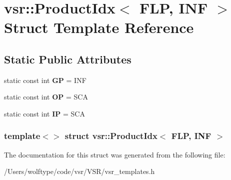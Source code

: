 \hypertarget{structvsr_1_1_product_idx_3_01_f_l_p_00_01_i_n_f_01_4}{\section{vsr\-:\-:Product\-Idx$<$ F\-L\-P, I\-N\-F $>$ Struct Template Reference}
\label{structvsr_1_1_product_idx_3_01_f_l_p_00_01_i_n_f_01_4}
}
\subsection*{Static Public Attributes}
\begin{DoxyCompactItemize}
\item 
\hypertarget{structvsr_1_1_product_idx_3_01_f_l_p_00_01_i_n_f_01_4_ad25040cd987877b0da7457c35a557c15}{static const int {\bfseries G\-P} = I\-N\-F}\label{structvsr_1_1_product_idx_3_01_f_l_p_00_01_i_n_f_01_4_ad25040cd987877b0da7457c35a557c15}

\item 
\hypertarget{structvsr_1_1_product_idx_3_01_f_l_p_00_01_i_n_f_01_4_af3b2e21d87e7db7b07ad67b0cea2b273}{static const int {\bfseries O\-P} = S\-C\-A}\label{structvsr_1_1_product_idx_3_01_f_l_p_00_01_i_n_f_01_4_af3b2e21d87e7db7b07ad67b0cea2b273}

\item 
\hypertarget{structvsr_1_1_product_idx_3_01_f_l_p_00_01_i_n_f_01_4_abbccdc41cc3de9262280caf10fcfdc0c}{static const int {\bfseries I\-P} = S\-C\-A}\label{structvsr_1_1_product_idx_3_01_f_l_p_00_01_i_n_f_01_4_abbccdc41cc3de9262280caf10fcfdc0c}

\end{DoxyCompactItemize}
\subsubsection*{template$<$$>$ struct vsr\-::\-Product\-Idx$<$ F\-L\-P, I\-N\-F $>$}



The documentation for this struct was generated from the following file\-:\begin{DoxyCompactItemize}
\item 
/\-Users/wolftype/code/vsr/\-V\-S\-R/vsr\-\_\-templates.\-h\end{DoxyCompactItemize}
